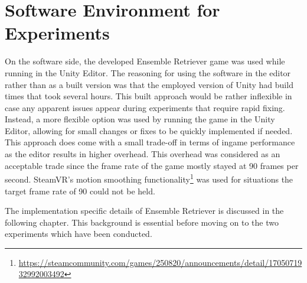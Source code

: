 \section{Software Environment for Experiments}
On the software side, the developed Ensemble Retriever game was used while running in the Unity Editor. The reasoning for using the software in the editor rather than as a built version was that the employed version of Unity had build times that took several hours. This built approach would be rather inflexible in case any apparent issues appear during experiments that require rapid fixing. Instead, a more flexible option was used by running the game in the Unity Editor, allowing for small changes or fixes to be quickly implemented if needed. This approach does come with a small trade-off in terms of ingame performance as the editor results in higher overhead. This overhead was considered as an acceptable trade since the frame rate of the game mostly stayed at 90 frames per second. SteamVR's motion smoothing functionality\footnote{\url{https://steamcommunity.com/games/250820/announcements/detail/1705071932992003492}} was used for situations the target frame rate of 90 could not be held. 

The implementation specific details of Ensemble Retriever is discussed in the following chapter. This background is essential before moving on to the two experiments which have been conducted. 